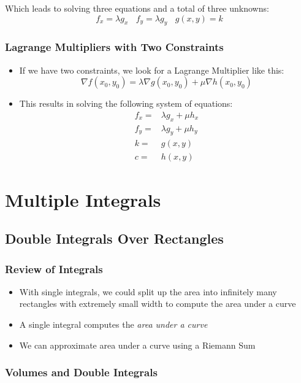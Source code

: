 \documentclass{package/notes}
\begin{document}
Which leads to solving three equations and a total of three unknowns:
$$f_x = \lambda g_x\:\:\:\:f_y=\lambda g_y\:\:\:\:g(x,y)=k$$


\subsection{Lagrange Multipliers with Two Constraints}

\begin{itemize}
	\item If we have two constraints, we look for a Lagrange Multiplier like this:
	$$\nabla f(x_0,y_0) = \lambda \nabla g(x_0,y_0) + \mu \nabla h(x_0,y_0)$$
	\item This results in solving the following system of equations:
	$$
	\begin{aligned}
		f_x=&\lambda g_x+\mu h_x\\
		f_y =& \lambda g_y + \mu h_y\\
		k =& g(x,y)\\
		c =& h(x,y)
	\end{aligned}
	$$
\end{itemize}

\chapter{Multiple Integrals}


\section{Double Integrals Over Rectangles}


\subsection{Review of Integrals}

\begin{itemize}
	\item With single integrals, we could split up the area into infinitely many rectangles with extremely small width to compute the area under a curve
	\item A single integral computes the \textit{area under a curve}
	\item We can approximate area under a curve using a Riemann Sum
\end{itemize}


\subsection{Volumes and Double Integrals}
\end{document}
